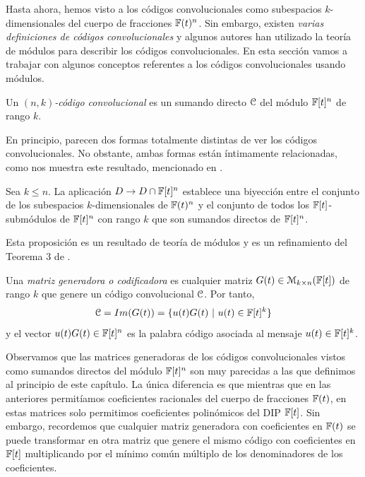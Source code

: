 Hasta ahora, hemos visto a los códigos convolucionales como subespacios $k$-dimensionales del cuerpo de fracciones $\mathbb{F}(t)^n$. Sin embargo, existen \emph{varias definiciones de códigos convolucionales} y algunos autores han utilizado la teoría de módulos para describir los códigos convolucionales. En esta sección vamos a trabajar con algunos conceptos referentes a los códigos convolucionales usando módulos.


\begin{definicion} \label{def:ccm}
Un \emph{$(n,k)$-código convolucional} es un sumando directo $\mathcal C$ del módulo $\mathbb{F}[t]^n$ de rango $k$.
\end{definicion}

En principio, parecen dos formas totalmente distintas de ver los códigos convolucionales. No obstante, ambas formas están íntimamente relacionadas, como nos muestra este resultado, mencionado en \cite{gomez2017sugiyama}.

\begin{proposicion}\label{prop:relacion}
Sea $k \leq n$. La aplicación $D \rightarrow D \cap \mathbb{F}[t]^n$ establece una biyección entre el conjunto de los subespacios $k$-dimensionales de $\mathbb{F}(t)^n$ y el conjunto de todos los $\mathbb{F}[t]$-submódulos de $\mathbb{F}[t]^n$ con rango $k$ que son sumandos directos de $\mathbb{F}[t]^n$.
\end{proposicion}

Esta proposición es un resultado de teoría de módulos y es un refinamiento del Teorema 3 de \cite{Forney1970}.

\begin{definicion}
Una \emph{matriz generadora o codificadora} es cualquier matriz $G(t) \in \mathcal{M}_{k \times n}(\mathbb{F}[t])$ de rango $k$ que genere un código convolucional $\mathcal C$. Por tanto, 
$$ \mathcal C = Im(G(t)) = \{u(t)G(t) \ | \ u(t) \in \mathbb{F}[t]^k\} $$ y el vector $u(t)G(t) \in \mathbb{F}[t]^n$ es la palabra código asociada al mensaje $u(t) \in \mathbb{F}[t]^k$.
\end{definicion}

Observamos que las matrices generadoras de los códigos convolucionales vistos como sumandos directos del módulo $\mathbb{F}[t]^n$ son muy parecidas a las que definimos al principio de este capítulo. La única diferencia es que mientras que en las anteriores permitíamos coeficientes racionales del cuerpo de fracciones $\mathbb{F}(t)$, en estas matrices solo permitimos coeficientes polinómicos del DIP $\mathbb{F}[t]$. Sin embargo, recordemos que cualquier matriz generadora con coeficientes en $\mathbb{F}(t)$ se puede transformar en otra matriz que genere el mismo código con coeficientes en $\mathbb{F}[t]$ multiplicando por el mínimo común múltiplo de los denominadores de los coeficientes.


